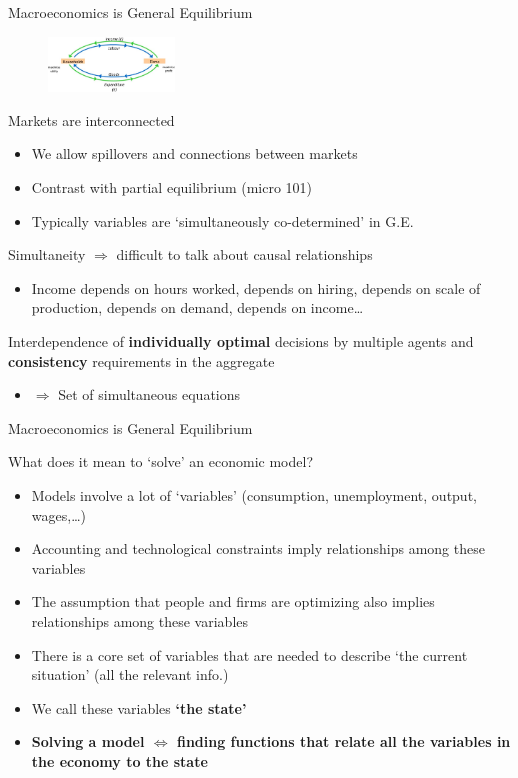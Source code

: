 \begin{frame}{Macroeconomics is General Equilibrium}

\begin{figure}
\centering
\label{fig:ge_feedback}
\includegraphics[width=0.3\textwidth]{Figures/ge_feedback.JPG}
\end{figure}
Markets are interconnected
	\begin{itemize}
	\item	We allow spillovers and connections between markets
	\item	Contrast with partial equilibrium (micro 101)
	\item	Typically variables are `simultaneously co-determined' in G.E.
	\end{itemize}
Simultaneity $\Rightarrow$ difficult to talk about causal relationships
	\begin{itemize}
	\item	Income depends on hours worked, depends on hiring, depends on scale of production, depends on demand, depends on income\ldots
	\end{itemize}
Interdependence of \textbf{individually optimal} decisions by multiple agents and \textbf{consistency} requirements in the aggregate
	\begin{itemize}
	\item	$\Rightarrow$ Set of simultaneous equations
	\end{itemize}

\end{frame}


\begin{frame}{Macroeconomics is General Equilibrium}

What does it mean to `solve' an economic model?
\begin{itemize}
\item	Models involve a lot of `variables' (consumption, unemployment, output, wages,\ldots)
\item	Accounting and technological constraints imply relationships among these variables
\item	The assumption that people and firms are optimizing also implies relationships among these variables
\item	There is a core set of variables that are needed to describe `the current situation' (all the relevant info.)
\item	We call these variables \textbf{`the state'}
\item	\textbf{Solving a model $\Leftrightarrow$ finding functions that relate all the variables in the economy to the state}
\end{itemize}

\end{frame}

